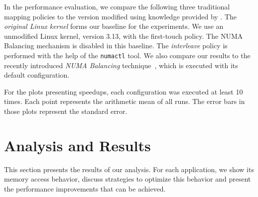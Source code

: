 In the performance evaluation, we compare the following three traditional
mapping policies to the version modified using knowledge provided by \TABARNAC.
The \emph{original Linux kernel} forms our baseline for the experiments. We use an unmodified Linux kernel, version 3.13, with the first-touch policy. The NUMA Balancing mechanism is disabled in this baseline.
The \emph{interleave} policy is performed with the help of the \texttt{numactl} tool.
We also compare our results to the recently introduced \emph{NUMA Balancing} technique~\cite{Corbet}, which is executed with its default configuration.

For the plots presenting speedups, each configuration was executed at least 10 times. Each point represents the arithmetic mean of all runs.
The error bars in those plots represent the standard error.


\section{Analysis and Results}
\label{sec:expe-analysis}

This section presents the results of our analysis.
For each application, we show its memory access behavior, discuss strategies to optimize this behavior and present the performance improvements that can be achieved.






